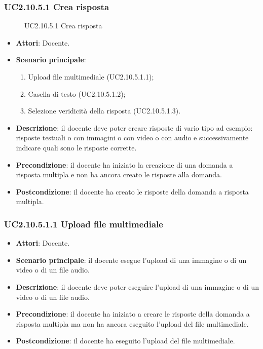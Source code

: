 \subsubsection{UC2.10.5.1 Crea risposta}
\begin{figure}[H]
\centering
\noindent{}
\caption{UC2.10.5.1 Crea risposta}
\end{figure}
\begin{itemize}
\item \textbf{Attori}: Docente.
\item \textbf{Scenario principale}:
\begin{enumerate}
\item Upload file multimediale (UC2.10.5.1.1);
\item Casella di testo (UC2.10.5.1.2);
\item Selezione veridicità della risposta (UC2.10.5.1.3).
\end{enumerate}
\item \textbf{Descrizione}: il docente deve poter creare risposte di vario tipo ad esempio: risposte testuali o con immagini o con video o con audio e successivamente indicare quali sono le risposte corrette.
\item \textbf{Precondizione}: il docente ha iniziato la creazione di una domanda a risposta multipla e non ha ancora creato le risposte alla domanda.
\item \textbf{Postcondizione}: il docente ha creato le risposte della domanda a risposta multipla.
\end{itemize}
\subsubsection{UC2.10.5.1.1 Upload file multimediale}
\begin{itemize}
\item \textbf{Attori}: Docente.
\item \textbf{Scenario principale}: il docente esegue l'upload di una immagine o di un video o di un file audio.
\item \textbf{Descrizione}: il docente deve poter eseguire l'upload di una immagine o di un video o di un file audio.
\item \textbf{Precondizione}: il docente ha iniziato a creare le risposte della domanda a risposta multipla ma non ha ancora eseguito l'upload del file multimediale.
\item \textbf{Postcondizione}: il docente ha eseguito l'upload del file multimediale.
\end{itemize}
